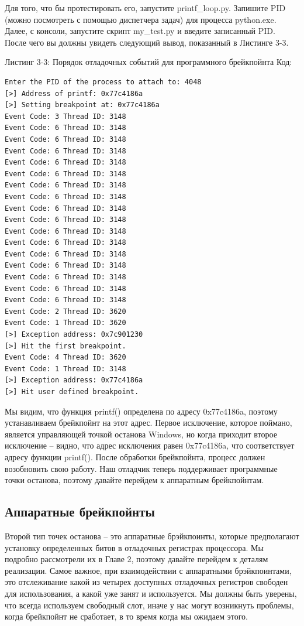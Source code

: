 \documentclass[12pt]{book}
\begin{document}
Для того, что бы протестировать его, запустите printf\_loop.py. Запишите PID (можно посмотреть с помощью диспетчера задач) для процесса python.exe. Далее, с консоли, запустите скрипт my\_test.py и введите записанный PID. После чего вы должны увидеть следующий вывод, показанный в Листинге 3-3.

Листинг 3-3: Порядок отладочных событий для программного брейкпойнта
Код:
\begin{lstlisting}
Enter the PID of the process to attach to: 4048
[>] Address of printf: 0x77c4186a
[>] Setting breakpoint at: 0x77c4186a
Event Code: 3 Thread ID: 3148
Event Code: 6 Thread ID: 3148
Event Code: 6 Thread ID: 3148
Event Code: 6 Thread ID: 3148
Event Code: 6 Thread ID: 3148
Event Code: 6 Thread ID: 3148
Event Code: 6 Thread ID: 3148
Event Code: 6 Thread ID: 3148
Event Code: 6 Thread ID: 3148
Event Code: 6 Thread ID: 3148
Event Code: 6 Thread ID: 3148
Event Code: 6 Thread ID: 3148
Event Code: 6 Thread ID: 3148
Event Code: 6 Thread ID: 3148
Event Code: 6 Thread ID: 3148
Event Code: 6 Thread ID: 3148
Event Code: 6 Thread ID: 3148
Event Code: 2 Thread ID: 3620
Event Code: 1 Thread ID: 3620
[>] Exception address: 0x7c901230
[>] Hit the first breakpoint.
Event Code: 4 Thread ID: 3620
Event Code: 1 Thread ID: 3148
[>] Exception address: 0x77c4186a
[>] Hit user defined breakpoint.
\end{lstlisting}

Мы видим, что функция printf() определена по адресу 0x77c4186a, поэтому устанавливаем брейкпойнт на этот адрес. Первое исключение, которое поймано, является управляющей точкой останова Windows, но когда приходит второе исключение – видно, что адрес исключения равен 0x77c4186a, что соответствует адресу функции printf(). После обработки брейкпойнта, процесс должен возобновить свою работу. Наш отладчик теперь поддерживает программные точки останова, поэтому давайте перейдем к аппаратным брейкпойнтам.

\subsection{Аппаратные брейкпойнты}

Второй тип точек останова – это аппаратные брэйкпоинты, которые предполагают установку определенных битов в отладочных регистрах процессора. Мы подробно рассмотрели их в Главе 2, поэтому давайте перейдем к деталям реализации. Самое важное, при взаимодействии с аппаратными брэйкпоинтами, это отслеживание какой из четырех доступных отладочных регистров свободен для использования, а какой уже занят и используется. Мы должны быть уверены, что всегда используем свободный слот, иначе у нас могут возникнуть проблемы, когда брейкпойнт не сработает, в то время когда мы ожидаем этого.
\end{document}
